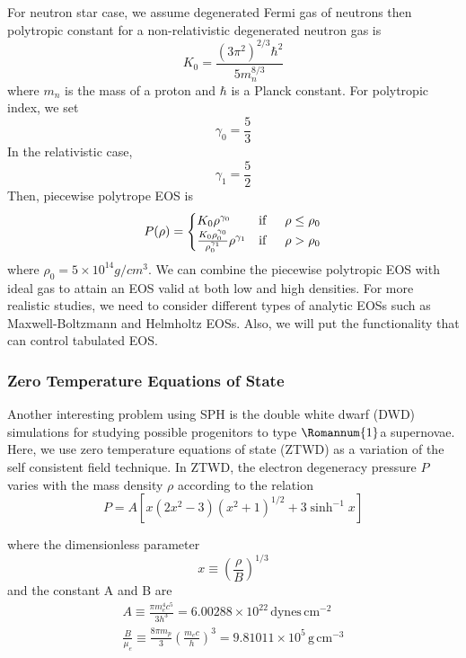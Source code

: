 \documentclass[notes.tex]{subfiles}
\begin{document}
For neutron star case, we assume degenerated Fermi gas of neutrons then polytropic constant for a non-relativistic degenerated neutron gas is
\begin{equation}
K_0 = \frac{(3 \pi^2)^{2/3} \hbar^2}{5 m_n^{8/3}}
\end{equation}
where $m_n$ is the mass of a proton and $\hbar$ is a Planck constant. For polytropic index, we set
\begin{equation}
\gamma_0 = \frac{5}{3}
\end{equation}
In the relativistic case,
\begin{equation}
\gamma_1 = \frac{5}{2}
\end{equation}
Then, piecewise polytrope EOS is
\begin{equation}
P(\rho) = \begin{cases}
K_0 \rho^{\gamma_0} & \text{if} \indent \rho \leq \rho_0 \\
\frac{K_0 \rho_0^{\gamma_0}}{\rho_0^{\gamma_1}} \rho^{\gamma_1} & \text{if} \indent \rho > \rho_0
\end{cases}
\end{equation}
where $\rho_0 = 5 \times 10^{14} g/cm^3$. We can combine the piecewise polytropic EOS with ideal gas to attain an EOS valid at both low and high densities. For more realistic studies, we need to consider different types of analytic EOSs such as Maxwell-Boltzmann and Helmholtz EOSs. Also, we will put the functionality that can control tabulated EOS.

\subsubsection{Zero Temperature Equations of State}
Another interesting problem using SPH is the double white dwarf (DWD) simulations for studying possible progenitors to type $\Romannum{1}$a supernovae. Here, we use zero temperature equations of state (ZTWD) as a variation of the self consistent field technique. In ZTWD, the electron degeneracy pressure $P$ varies with the mass density $\rho$ according to the relation
\begin{equation}
P = A \left[ x(2x^2-3)(x^2+1)^{1/2} + 3 \sinh^{-1} x \right]
\end{equation}

where the dimensionless parameter
\begin{equation}
x \equiv \left( \frac{\rho}{B} \right)^{1/3}
\end{equation}
and the constant A and B are
\begin{align}
A \equiv \frac{\pi m_e^4 c^5}{3h^3} = 6.00288 \times 10^{22} \, \text{dynes} \, \text{cm}^{-2} \\
\frac{B}{\mu_e} \equiv \frac{8 \pi m_p}{3} \left(\frac{m_e c}{h} \right)^3 = 9.81011 \times 10^5 \, \text{g} \, \text{cm}^{-3}
\end{align}
\end{document}
